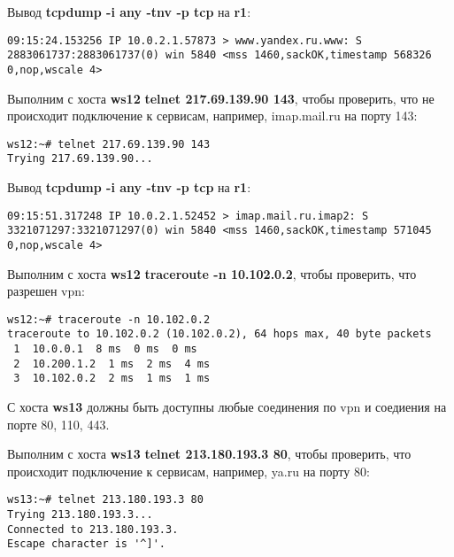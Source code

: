 \documentclass[a4paper,12pt]{article}
\begin{document}
Вывод \textbf{tcpdump -i any -tnv -p tcp} на \textbf{r1}:
\begin{Verbatim}
09:15:24.153256 IP 10.0.2.1.57873 > www.yandex.ru.www: S 2883061737:2883061737(0) win 5840 <mss 1460,sackOK,timestamp 568326 0,nop,wscale 4>
\end{Verbatim}

Выполним с хоста \textbf{ws12} \textbf{telnet 217.69.139.90 143},  чтобы проверить,
что не происходит подключение к сервисам, например, imap.mail.ru на порту 143:
\begin{Verbatim}
ws12:~# telnet 217.69.139.90 143
Trying 217.69.139.90...
\end{Verbatim}

Вывод \textbf{tcpdump -i any -tnv -p tcp} на \textbf{r1}:
\begin{Verbatim}
09:15:51.317248 IP 10.0.2.1.52452 > imap.mail.ru.imap2: S 3321071297:3321071297(0) win 5840 <mss 1460,sackOK,timestamp 571045 0,nop,wscale 4>
\end{Verbatim}

Выполним с хоста \textbf{ws12} \textbf{traceroute -n 10.102.0.2},  чтобы проверить,
что разрешен vpn:
\begin{Verbatim}
ws12:~# traceroute -n 10.102.0.2
traceroute to 10.102.0.2 (10.102.0.2), 64 hops max, 40 byte packets
 1  10.0.0.1  8 ms  0 ms  0 ms
 2  10.200.1.2  1 ms  2 ms  4 ms
 3  10.102.0.2  2 ms  1 ms  1 ms
\end{Verbatim}


С хоста \textbf{ws13} должны быть доступны любые соединения по vpn и соедиения
на порте 80, 110, 443.

Выполним с хоста \textbf{ws13} \textbf{telnet 213.180.193.3 80},  чтобы проверить, что
происходит подключение к сервисам, например, ya.ru на порту 80:
\begin{Verbatim}
ws13:~# telnet 213.180.193.3 80
Trying 213.180.193.3...
Connected to 213.180.193.3.
Escape character is '^]'.
\end{Verbatim}
\end{document}
